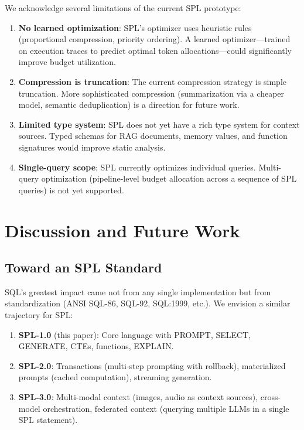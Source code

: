 \documentclass[11pt,a4paper]{article}
\begin{document}
We acknowledge several limitations of the current SPL prototype:

\begin{enumerate}[nosep]
  \item \textbf{No learned optimization}: SPL's optimizer uses heuristic rules (proportional compression, priority ordering). A learned optimizer---trained on execution traces to predict optimal token allocations---could significantly improve budget utilization.
  \item \textbf{Compression is truncation}: The current compression strategy is simple truncation. More sophisticated compression (summarization via a cheaper model, semantic deduplication) is a direction for future work.
  \item \textbf{Limited type system}: SPL does not yet have a rich type system for context sources. Typed schemas for RAG documents, memory values, and function signatures would improve static analysis.
  \item \textbf{Single-query scope}: SPL currently optimizes individual queries. Multi-query optimization (pipeline-level budget allocation across a sequence of SPL queries) is not yet supported.
\end{enumerate}

\section{Discussion and Future Work}
\label{sec:discussion}

\subsection{Toward an SPL Standard}

SQL's greatest impact came not from any single implementation but from standardization (ANSI SQL-86, SQL-92, SQL:1999, etc.). We envision a similar trajectory for SPL:

\begin{enumerate}[nosep]
  \item \textbf{SPL-1.0} (this paper): Core language with PROMPT, SELECT, GENERATE, CTEs, functions, EXPLAIN.
  \item \textbf{SPL-2.0}: Transactions (multi-step prompting with rollback), materialized prompts (cached computation), streaming generation.
  \item \textbf{SPL-3.0}: Multi-modal context (images, audio as context sources), cross-model orchestration, federated context (querying multiple LLMs in a single SPL statement).
\end{enumerate}
\end{document}
